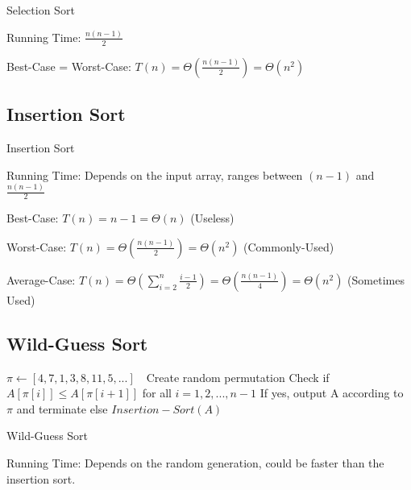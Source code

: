 \documentclass[10pt]{article}
\begin{document}
\begin{algorithm}
	\SetAlgoLined
	\caption{Selection Sort}
\end{algorithm}

Running Time: $\frac{n(n-1)}{2}$

Best-Case = Worst-Case: $T(n) = \Theta(\frac{n(n-1)}{2}) = \Theta(n^2)$

\subsection{Insertion Sort}

\begin{algorithm}
	\SetAlgoLined
	\caption{Insertion Sort}
\end{algorithm}

Running Time: Depends on the input array, ranges between $(n-1)$ and $\frac{n(n-1)}{2}$

Best-Case: $T(n) = n-1 = \Theta(n)$ (Useless)

Worst-Case: $T(n) = \Theta(\frac{n(n-1)}{2}) = \Theta(n^2)$ (Commonly-Used)

Average-Case: $T(n) = \Theta(\sum_{i=2}^n \frac{i-1}{2}) = \Theta(\frac{n(n-1)}{4}) = \Theta(n^2)$ (Sometimes Used)

\subsection{Wild-Guess Sort}

\begin{algorithm}
	\SetAlgoLined
	$\pi \gets [4,7,1,3,8,11,5,...]$\ \ Create random permutation
	Check if $A[\pi[i]] \leq A[\pi[i+1]]$ for all $i = 1,2,...,n-1$
	If yes, output A according to $\pi$ and terminate
	else $Insertion-Sort(A)$
	\caption{Wild-Guess Sort}
\end{algorithm}

Running Time: Depends on the random generation, could be faster than the insertion sort.
\end{document}
